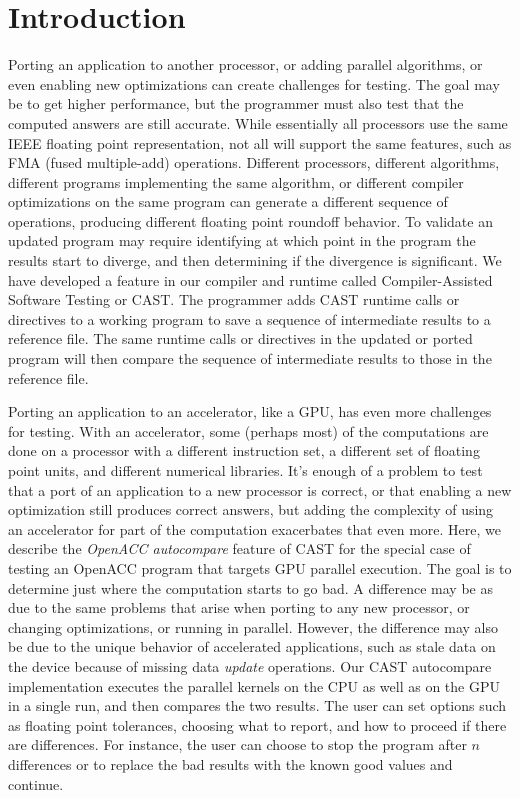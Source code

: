 \section{Introduction}

Porting an application to another processor, or adding parallel algorithms, or even enabling new optimizations can create challenges for testing.
The goal may be to get higher performance, but the programmer must also test that the computed answers are still accurate.
While essentially all processors use the same IEEE floating point representation, not all will support the same features, such as FMA (fused multiple-add) operations.
Different processors, different algorithms, different programs implementing the same algorithm, or different compiler optimizations on the same program can generate a different sequence of operations, producing different floating point roundoff behavior.
To validate an updated program may require identifying at which point in the program the results start to diverge, and then determining if the divergence is significant.
We have developed a feature in our compiler and runtime called Compiler-Assisted Software Testing or CAST\cite{ahmad.submitted.17}.
The programmer adds CAST runtime calls or directives to a working program to save a sequence of intermediate results to a reference file.
The same runtime calls or directives in the updated or ported program will then compare the sequence of intermediate results to those in the reference file.

Porting an application to an accelerator, like a GPU, has even more challenges for testing.
With an accelerator, some (perhaps most) of the computations are done on a processor with a different instruction set, a different set of floating point units, and different numerical libraries.
It's enough of a problem to test that a port of an application to a new processor is correct, or that enabling a new optimization still produces correct answers, but adding the complexity of using an accelerator for part of the computation exacerbates that even more.
Here, we describe the \emph{OpenACC autocompare} feature of CAST for the special case of testing an OpenACC\cite{openacc.16} program that targets GPU parallel execution.
The goal is to determine just where the computation starts to go bad.
A difference may be as due to the same problems that arise when porting to any new processor, or changing optimizations, or running in parallel.
However, the difference may also be due to the unique behavior of accelerated applications, such as stale data on the device because of missing data \emph{update} operations.
Our CAST autocompare implementation executes the parallel kernels on the CPU as well as on the GPU in a single run, and then compares the two results.
The user can set options such as floating point tolerances, choosing what to report, and how to proceed if there are differences.
For instance, the user can choose to stop the program after $n$ differences or to replace the bad results with the known good values and continue.

